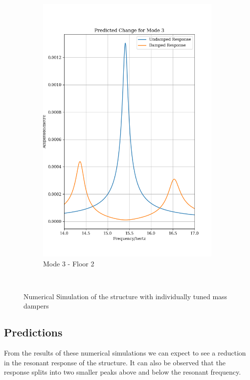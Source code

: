 \documentclass[8pt]{article}
\begin{document}
\begin{figure}[H]
{\begin{subfigure}[b]{.4\textwidth}
    \includegraphics[width=.95\textwidth]{m3.png}
    \vspace{-14pt}
    \caption{Mode 3 - Floor 2}
    \end{subfigure}%
    }\\
    \vspace{-14pt}
    \caption{Numerical Simulation of the structure with individually tuned mass dampers}
\end{figure}

\vspace{-14pt}
\subsection{Predictions}
\vspace{-14pt}

From the results of these numerical simulations we can expect to see a reduction in the resonant response of the structure. It can also be observed
that the response splits into two smaller peaks above and below the resonant frequency.
\end{document}
